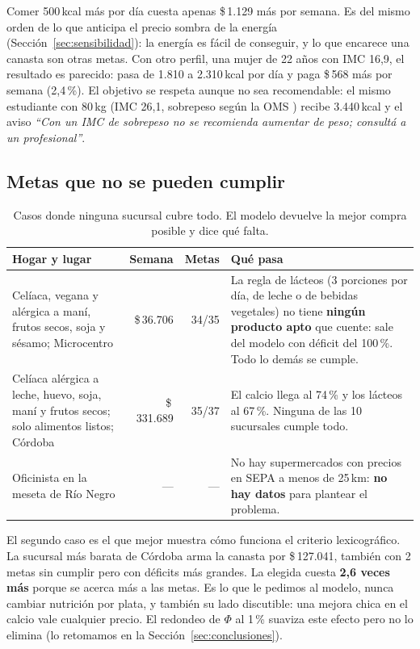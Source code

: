 \documentclass[10pt,a4paper]{article}
\newcommand{\pesos}[1]{\$\,#1}
\newcommand{\cita}[1]{\emph{``#1''}}
\begin{document}
Comer 500\,kcal más por día cuesta apenas \pesos{1.129} más por semana. Es del mismo
orden de lo que anticipa el precio sombra de la energía
(Sección~\ref{sec:sensibilidad}): la energía es fácil de conseguir, y lo que
encarece una canasta son otras metas. Con otro perfil, una mujer de 22 años con IMC
16,9, el resultado es parecido: pasa de 1.810 a 2.310\,kcal por día y paga
\pesos{568} más por semana (2,4\,\%). El objetivo se respeta aunque no sea
recomendable: el mismo estudiante con 80\,kg (IMC 26,1, sobrepeso según la OMS
\cite{oms-imc}) recibe 3.440\,kcal y el aviso \cita{Con un IMC de sobrepeso no se
recomienda aumentar de peso; consultá a un profesional}.

\subsection{Metas que no se pueden cumplir}

\begin{table}[H]
\centering\small
\caption{Casos donde ninguna sucursal cubre todo. El modelo devuelve la mejor compra
posible y dice qué falta.}
\label{tab:imposibles}
\renewcommand{\arraystretch}{1.2}
\begin{tabularx}{\linewidth}{@{}p{4.6cm}rrX@{}}
\toprule
\textbf{Hogar y lugar} & \textbf{Semana} & \textbf{Metas} & \textbf{Qué pasa} \\
\midrule
Celíaca, vegana y alérgica a maní, frutos secos, soja y sésamo; Microcentro & \pesos{36.706} & 34/35 & La regla de lácteos (3 porciones por día, de leche o de bebidas vegetales) no tiene \textbf{ningún producto apto} que cuente: sale del modelo con déficit del 100\,\%. Todo lo demás se cumple. \\
Celíaca alérgica a leche, huevo, soja, maní y frutos secos; solo alimentos listos; Córdoba & \pesos{331.689} & 35/37 & El calcio llega al 74\,\% y los lácteos al 67\,\%. Ninguna de las 10 sucursales cumple todo. \\
Oficinista en la meseta de Río Negro & — & — & No hay supermercados con precios en SEPA a menos de 25\,km: \textbf{no hay datos} para plantear el problema. \\
\bottomrule
\end{tabularx}
\end{table}

El segundo caso es el que mejor muestra cómo funciona el criterio lexicográfico. La
sucursal más barata de Córdoba arma la canasta por \pesos{127.041}, también con 2
metas sin cumplir pero con déficits más grandes. La elegida cuesta \textbf{2,6 veces
más} porque se acerca más a las metas. Es lo que le pedimos al modelo, nunca cambiar
nutrición por plata, y también su lado discutible: una mejora chica en el calcio vale
cualquier precio. El redondeo de $\Phi$ al 1\,\% suaviza este efecto pero no lo
elimina (lo retomamos en la Sección~\ref{sec:conclusiones}).
\end{document}
